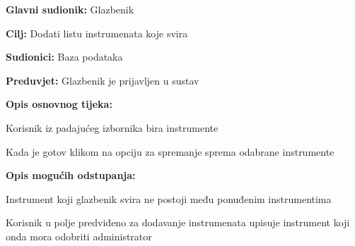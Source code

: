 	\noindent {}
	\begin{packed_item}
		
		\item \textbf{Glavni sudionik: } Glazbenik
		\item  \textbf{Cilj:} Dodati listu instrumenata koje svira
		\item  \textbf{Sudionici:} Baza podataka
		\item  \textbf{Preduvjet:} Glazbenik je prijavljen u sustav
		\item  \textbf{Opis osnovnog tijeka:}
		
		\item[] \begin{packed_enum}
			
			\item Korisnik iz padajućeg izbornika bira instrumente
			\item Kada je gotov klikom na opciju za spremanje sprema odabrane instrumente 
		\end{packed_enum}
		
		\item  \textbf{Opis mogućih odstupanja:}
		
		\item[] \begin{packed_item}
			
			\item[1.a] Instrument koji glazbenik svira ne postoji među ponuđenim instrumentima
			\item[] \begin{packed_enum}
				
				\item Korisnik u polje predviđeno za dodavanje instrumenata upisuje instrument koji onda mora odobriti administrator
				
			\end{packed_enum}	
		\end{packed_item}
		
	\end{packed_item}

